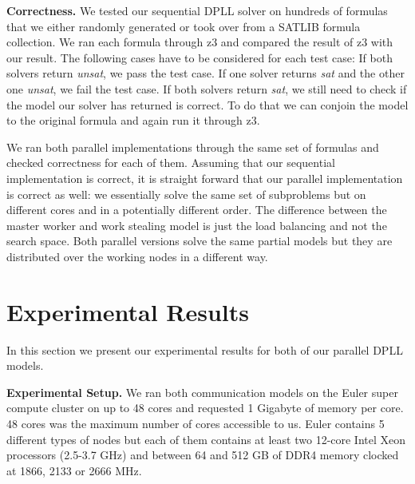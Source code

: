 \documentclass[letterpaper]{article}
\newcommand{\mypar}[1]{{\bf #1.}}
\begin{document}
\mypar{Correctness}
We tested our sequential DPLL solver on hundreds of formulas that we either randomly generated or took over from a SATLIB formula collection. \cite{cnf_website}
We ran each formula through z3 \cite{z3} and compared the result of z3 with our result.
The following cases have to be considered for each test case:
If both solvers return \textit{unsat}, we pass the test case.
If one solver returns \textit{sat} and the other one \textit{unsat}, we fail the test case.
If both solvers return \textit{sat}, we still need to check if the model our solver has returned is correct.
To do that we can conjoin the model to the original formula and again run it through z3.

We ran both parallel implementations through the same set of formulas and checked correctness for each of them.
Assuming that our sequential implementation is correct, it is straight forward that our parallel implementation is correct as well:
we essentially solve the same set of subproblems but on different cores and in a potentially different order.
The difference between the master worker and work stealing model is just the load balancing and not the search space.
Both parallel versions solve the same partial models but they are distributed over the working nodes in a different way.

\section{Experimental Results}\label{sec:exp}
In this section we present our experimental results for both of our parallel DPLL models.

\mypar{Experimental Setup}
We ran both communication models on the Euler super compute cluster \cite{euler} on up to 48 cores and requested 1 Gigabyte of memory per core.
48 cores was the maximum number of cores accessible to us.
Euler contains 5 different types of nodes but each of them contains at least two 12-core Intel Xeon processors (2.5-3.7 GHz) and between 64 and 512 GB of DDR4 memory clocked at 1866, 2133 or 2666 MHz.
\end{document}
